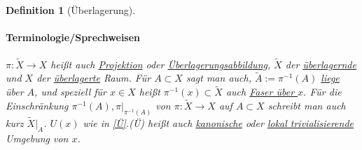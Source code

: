 \documentclass[a4paper,11pt,notitlepage]{report}
\newtheorem{definition}{Definition}[chapter]
\begin{document}
\begin{definition}[Überlagerung]
	\paragraph{Terminologie/Sprechweisen} $\pi \colon \tilde{X} \rightarrow X$ heißt auch \underline{Projektion} oder \underline{Überlagerungsabbildung}, $\tilde{X}$ der \underline{überlagernde} und $X$ der \underline{überlagerte} Raum.
	Für $A \subset X$ sagt man auch, $\tilde{A} := \pi^{-1}(A)$ \underline{liege} über $A$, und speziell für $x \in X$ heißt $\pi^{-1}(x) \subset \tilde{X}$ auch \underline{Faser über $x$}. Für die Einschränkung $\pi^{-1}(A), \pi \big |_{\pi^{-1}(A)}$ von $\pi \colon \tilde{X} \rightarrow X$ auf $A \subset X$ schreibt man auch kurz $\tilde{X} \big |_A$.
	\newline
	$U(x)$ wie in \ref{Ü}.(Ü) heißt auch \underline{kanonische} oder \underline{lokal trivialisierende} Umgebung von $x$.
\end{definition}
\end{document}

